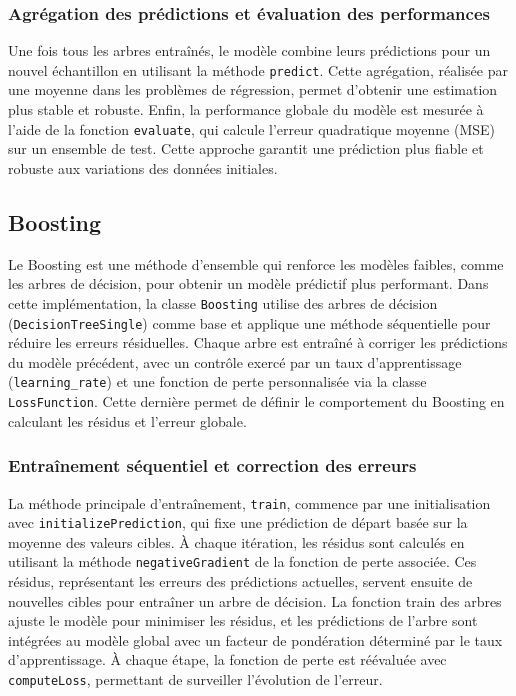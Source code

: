 \documentclass{rapportECL2024}
\newcommand{\var}[1]{\texttt{#1}}
\newcommand{\func}[1]{\small\texttt{#1}}
\begin{document}
\subsubsection{Agrégation des prédictions et évaluation des performances}
Une fois tous les arbres entraînés, le modèle combine leurs prédictions pour un nouvel échantillon en utilisant la méthode \func{predict}. Cette agrégation, réalisée par une moyenne dans les problèmes de régression, permet d’obtenir une estimation plus stable et robuste. Enfin, la performance globale du modèle est mesurée à l’aide de la fonction \func{evaluate}, qui calcule l’erreur quadratique moyenne (MSE) sur un ensemble de test. Cette approche garantit une prédiction plus fiable et robuste aux variations des données initiales.

\subsection{Boosting}
Le Boosting est une méthode d’ensemble qui renforce les modèles faibles, comme les arbres de décision, pour obtenir un modèle prédictif plus performant. Dans cette implémentation, la classe \var{Boosting} utilise des arbres de décision (\var{DecisionTreeSingle}) comme base et applique une méthode séquentielle pour réduire les erreurs résiduelles. Chaque arbre est entraîné à corriger les prédictions du modèle précédent, avec un contrôle exercé par un taux d’apprentissage (\var{learning_rate}) et une fonction de perte personnalisée via la classe \var{LossFunction}. Cette dernière permet de définir le comportement du Boosting en calculant les résidus et l’erreur globale.
\subsubsection{Entraînement séquentiel et correction des erreurs}
La méthode principale d'entraînement, \func{train}, commence par une initialisation avec \func{initializePrediction}, qui fixe une prédiction de départ basée sur la moyenne des valeurs cibles. À chaque itération, les résidus sont calculés en utilisant la méthode \func{negativeGradient} de la fonction de perte associée. Ces résidus, représentant les erreurs des prédictions actuelles, servent ensuite de nouvelles cibles pour entraîner un arbre de décision. La fonction train des arbres ajuste le modèle pour minimiser les résidus, et les prédictions de l’arbre sont intégrées au modèle global avec un facteur de pondération déterminé par le taux d’apprentissage. À chaque étape, la fonction de perte est réévaluée avec \func{computeLoss}, permettant de surveiller l’évolution de l’erreur.
\end{document}
